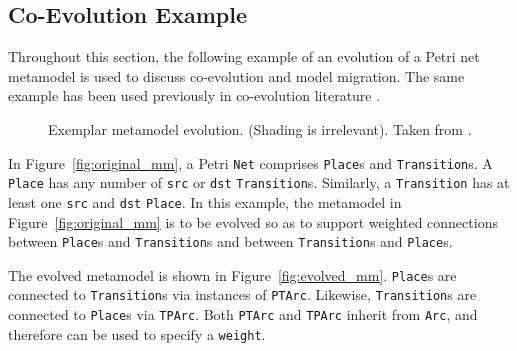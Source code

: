 \subsection{Co-Evolution Example}
\label{subsec:co-evo_example}
Throughout this section, the following example of an evolution of a Petri net metamodel is used to discuss co-evolution and model migration. The same example has been used previously in co-evolution literature \cite{cicchetti08automating,garces09managing,wachsmuth07metamodel}.

\begin{figure}[bp]
	\centering
	\caption{Exemplar metamodel evolution. (Shading is irrelevant). Taken from \cite{rose10flock}.}
\label{fig:petri_nets_mms}
\end{figure}

In Figure~\ref{fig:original_mm}, a Petri \texttt{Net} comprises \texttt{Place}s and \texttt{Transition}s. A \texttt{Place} has any number of \texttt{src} or \texttt{dst} \texttt{Transition}s. Similarly, a \texttt{Transition} has at least one \texttt{src} and \texttt{dst} \texttt{Place}. In this example, the metamodel in Figure~\ref{fig:original_mm} is to be evolved so as to support weighted connections between \texttt{Place}s and \texttt{Transition}s and between \texttt{Transition}s and \texttt{Place}s.

The evolved metamodel is shown in Figure~\ref{fig:evolved_mm}. \texttt{Place}s are connected to \texttt{Transition}s via instances of \texttt{PTArc}. Likewise, \texttt{Transition}s are connected to \texttt{Place}s via \texttt{TPArc}. Both \texttt{PTArc} and \texttt{TPArc} inherit from \texttt{Arc}, and therefore can be used to specify a \texttt{weight}.

